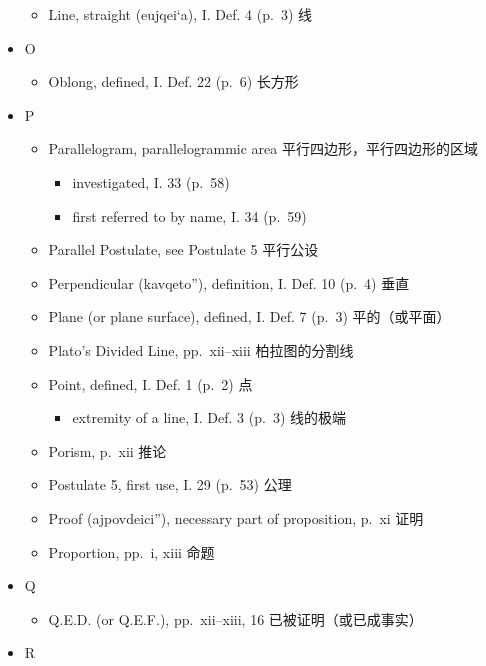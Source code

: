 \documentclass[
]{book}
\providecommand{\tightlist}{%
  \setlength{\itemsep}{0pt}\setlength{\parskip}{0pt}}
\begin{document}
\begin{itemize}
  \begin{itemize}
  \tightlist
  \item
    Line, straight (eujqei`a), I. Def. 4 (p.~3) 线
  \end{itemize}
\item
  O

  \begin{itemize}
  \tightlist
  \item
    Oblong, defined, I. Def. 22 (p.~6) 长方形
  \end{itemize}
\item
  P

  \begin{itemize}
  \tightlist
  \item
    Parallelogram, parallelogrammic area 平行四边形，平行四边形的区域

    \begin{itemize}
    \tightlist
    \item
      investigated, I. 33 (p.~58)\\
    \item
      first referred to by name, I. 34 (p.~59)\\
    \end{itemize}
  \item
    Parallel Postulate, see Postulate 5 平行公设
  \item
    Perpendicular (kavqeto''), definition, I. Def. 10 (p.~4) 垂直
  \item
    Plane (or plane surface), defined, I. Def. 7 (p.~3) 平的（或平面）
  \item
    Plato's Divided Line, pp.~xii--xiii 柏拉图的分割线
  \item
    Point, defined, I. Def. 1 (p.~2) 点

    \begin{itemize}
    \tightlist
    \item
      extremity of a line, I. Def. 3 (p.~3) 线的极端
    \end{itemize}
  \item
    Porism, p.~xii 推论
  \item
    Postulate 5, first use, I. 29 (p.~53) 公理
  \item
    Proof (ajpovdeici''), necessary part of proposition, p.~xi 证明
  \item
    Proportion, pp.~i, xiii 命题
  \end{itemize}
\item
  Q

  \begin{itemize}
  \tightlist
  \item
    Q.E.D. (or Q.E.F.), pp.~xii--xiii, 16 已被证明（或已成事实）
  \end{itemize}
\item
  R


\end{itemize}
\end{document}
